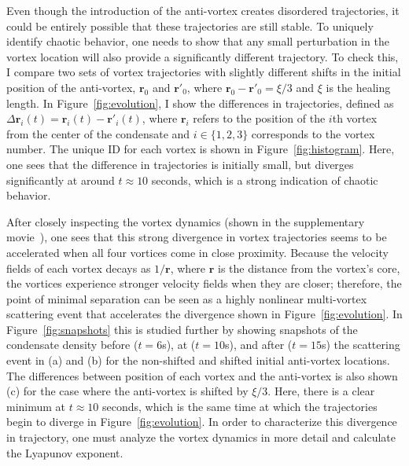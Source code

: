 Even though the introduction of the anti-vortex creates disordered trajectories, it could be entirely possible that these trajectories are still stable.
To uniquely identify chaotic behavior, one needs to show that any small perturbation in the vortex location will also provide a significantly different trajectory.
To check this, I compare two sets of vortex trajectories with slightly different shifts in the initial position of the anti-vortex, $\mathbf{r}_0$ and $\mathbf{r}'_0$, where $\mathbf{r}_0 - \mathbf{r}'_0 = \xi/3$ and $\xi$ is the healing length.
In Figure~\ref{fig:evolution}, I show the differences in trajectories, defined as $\Delta \mathbf{r}_i(t) = \mathbf{r}_{i}(t)-\mathbf{r}'_{i}(t)$, where $\mathbf{r}_i$ refers to the position of the $i$th vortex from the center of the condensate and $i\in \{1,2,3\}$ corresponds to the vortex number.
The unique ID for each vortex is shown in Figure~\ref{fig:histogram}.
Here, one sees that the difference in trajectories is initially small, but diverges significantly at around $t \approx 10$ seconds, which is a strong indication of chaotic behavior.

After closely inspecting the vortex dynamics (shown in the supplementary movie~\cite{movie}), one sees that this strong divergence in vortex trajectories seems to be accelerated when all four vortices come in close proximity.
Because the velocity fields of each vortex decays as $1/\mathbf{r}$, where $\mathbf{r}$ is the distance from the vortex's core, the vortices experience stronger velocity fields when they are closer; therefore, the point of minimal separation can be seen as a highly nonlinear multi-vortex scattering event that accelerates the divergence shown in Figure~\ref{fig:evolution}.
In Figure~\ref{fig:snapshots} this is studied further by showing snapshots of the condensate density before ($t = 6$s), at ($t = 10$s), and after ($t = 15$s) the scattering event in (a) and (b) for the non-shifted and shifted initial anti-vortex locations.
The differences between position of each vortex and the anti-vortex is also shown (c) for the case where the anti-vortex is shifted by $\xi/3$.
Here, there is a clear minimum at $t \approx 10$ seconds, which is the same time at which the  trajectories begin to diverge in Figure~\ref{fig:evolution}.
In order to characterize this divergence in trajectory, one must analyze the vortex dynamics in more detail and calculate the Lyapunov exponent.


